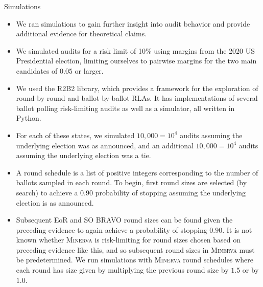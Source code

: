 \documentclass[final]{beamer}
\newcommand{\Minerva}{\textsc{Minerva}\xspace}
\newcommand{\BRAVO}{\textsc{BRAVO}\xspace}
\newlength{\colwidth}
\begin{document}
\begin{frame}[t]
\begin{columns}[t]
\begin{column}{\colwidth}
\begin{block}{Simulations}
\begin{itemize}
\item
We ran simulations to gain further insight into audit behavior 
and provide additional evidence for theoretical claims.
\item 
We simulated audits for a risk limit of 10\% using margins
from the 2020 US Presidential election, limiting ourselves to pairwise margins
for the two main candidates of $0.05$ or larger.
\item 
We used the R2B2 library, which provides a framework for the exploration
of round-by-round and ballot-by-ballot RLAs. It has implementations of several
ballot polling risk-limiting audits as well as a simulator, all written in Python.
\item
For each of these states, we simulated 
$10,000=10^4$ audits assuming the underlying election was as announced,  
and an additional $10,000=10^4$ audits assuming the underlying election was a tie. 
\end{itemize}
\end{block}

\begin{itemize}
\item
A round schedule is a list of positive integers corresponding to the number of ballots 
sampled in each round.
To begin, first round sizes are selected (by search) to achieve a $0.90$
probability of stopping assuming the underlying election is as announced.
\item
Subsequent EoR and SO \BRAVO round sizes can be found given the preceding evidence to 
again achieve a probability of stopping $0.90$. It is not known whether \Minerva is 
risk-limiting for round sizes chosen based on preceding evidence like this, and 
so subsequent round sizes in \Minerva must be predetermined. We run simulations with
\Minerva round schedules where each round has size given by multiplying the previous
round size by $1.5$ or by $1.0$.

\end{itemize}


\end{column}
\end{columns}
\end{frame}
\end{document}

